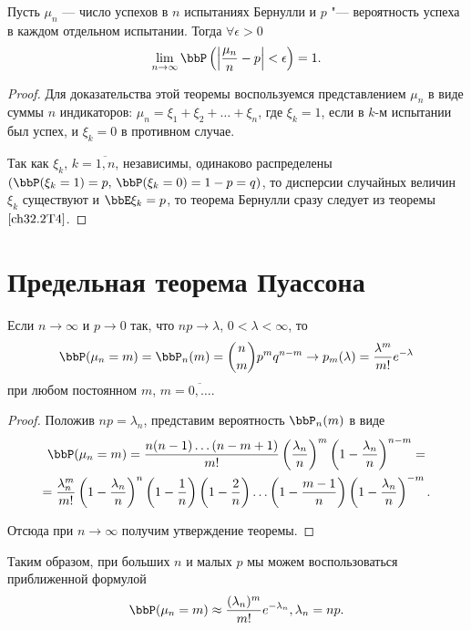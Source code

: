 \begin{thm} 
Пусть $\mu_n$ --- число успехов в $n$ испытаниях Бернулли и $p$ "--- вероятность успеха в каждом отдельном испытании. Тогда $\forall \epsilon > 0$
\begin{equation} \label{ch32.2eq7}
\lim_{n \to \infty} \bbP \left( \left| \frac{\mu_n}{n} - p \right| < \epsilon \right) = 1.
\end{equation}
\end{thm}

\begin{proof}
Для доказательства этой теоремы воспользуемся представлением $\mu_n$ в виде суммы $n$ индикаторов: $\mu_n = \xi_1 + \xi_2 + \ldots + \xi_n$, где $\xi_k = 1$, если в $k$-м испытании был успех, и $\xi_k  = 0$ в противном случае.

Так как $\xi_k$, $k = \overline{1,n}$, независимы, одинаково распределены $(\bbP( \xi_k = 1) = p, \,\bbP( \xi_k = 0) = 1 - p = q)$, то дисперсии случайных величин $\xi_k$ существуют и $\bbE  \xi_k = p$, то теорема Бернулли сразу следует из теоремы $\ref{ch32.2T4}$.
\end{proof}

\section{Предельная теорема Пуассона}
\begin{thm} 
Если $n \to \infty$ и $p \to 0$ так, что $np \to \lambda$, $0 < \lambda < \infty$, то
$$
\bbP(\mu_n = m) = \bbP_n(m) = \binom n m p^mq^{n - m} \to p_m(\lambda) = \frac{\lambda^m}{m!} e^{-\lambda}
$$
при любом постоянном $m$,  $m = \overline{0,\dots}$.
\end{thm}

\begin{proof}
Положив $np = \lambda_n$, представим вероятность $\bbP_n(m)$ в виде
\begin{multline*}
\bbP(\mu_n = m) = \frac{n(n - 1)\ldots(n - m + 1)}{m!} \left( \frac{\lambda_n}{n}\right)^m\left( 1 - \frac{\lambda_n}{n}\right)^{n - m} = \\
= \frac{\lambda_n^m}{m!} \left( 1 - \frac{\lambda_n}{n}\right)^n \left( 1 - \frac{1}{n}\right)\left(1 - \frac{2}{n} \right) \ldots \left( 1 - \frac{m - 1}{n}\right)\left(1 - \frac{\lambda_n}{n} \right)^{-m}.
\end{multline*}

Отсюда при $n \to \infty$ получим утверждение теоремы.
\end{proof}

Таким образом, при больших $n$ и малых $p$ мы можем воспользоваться приближенной формулой
$$
\bbP(\mu_n = m) \approx \frac{(\lambda_n)^m}{m!} e^{-\lambda_n},	\lambda_n = np.
$$
\fi